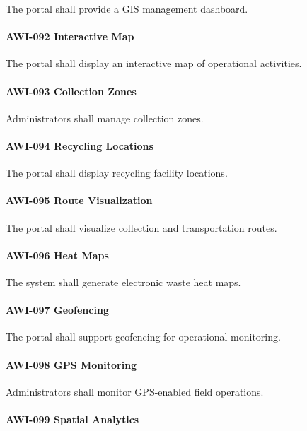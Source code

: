 The portal shall provide a GIS management dashboard.

\paragraph{AWI-092 Interactive Map}

The portal shall display an interactive map of operational activities.

\paragraph{AWI-093 Collection Zones}

Administrators shall manage collection zones.

\paragraph{AWI-094 Recycling Locations}

The portal shall display recycling facility locations.

\paragraph{AWI-095 Route Visualization}

The portal shall visualize collection and transportation routes.

\paragraph{AWI-096 Heat Maps}

The system shall generate electronic waste heat maps.

\paragraph{AWI-097 Geofencing}

The portal shall support geofencing for operational monitoring.

\paragraph{AWI-098 GPS Monitoring}

Administrators shall monitor GPS-enabled field operations.

\paragraph{AWI-099 Spatial Analytics}

